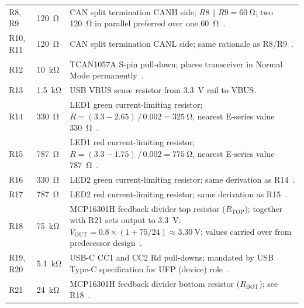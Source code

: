 \begin{longtable}{p{} p{} p{}}
  R8, R9
    & \SI{120}{\ohm}
    & CAN split termination CANH side; $R8 \parallel R9 = \SI{60}{\ohm}$;
      two \SI{120}{\ohm} in parallel preferred over one
      \SI{60}{\ohm}~\cite{ref16,ref17}. \\[4pt]

  R10, R11
    & \SI{120}{\ohm}
    & CAN split termination CANL side; same rationale as
      R8/R9~\cite{ref16,ref17}. \\[4pt]

  R12
    & \SI{10}{\kilo\ohm}
    & TCAN1057A S-pin pull-down; places transceiver in Normal Mode
      permanently~\cite{ref7}. \\[4pt]

  R13
    & \SI{1.5}{\kilo\ohm}
    & USB VBUS sense resistor from \SI{3.3}{\volt} rail to VBUS. \\[4pt]

  R14
    & \SI{330}{\ohm}
    & LED1 green current-limiting resistor;
      $R = (3.3 - 2.65)\,/\,0.002 = \SI{325}{\ohm}$,
      nearest E-series value \SI{330}{\ohm}~\cite{ref5}. \\[4pt]

  R15
    & \SI{787}{\ohm}
    & LED1 red current-limiting resistor;
      $R = (3.3 - 1.75)\,/\,0.002 = \SI{775}{\ohm}$,
      nearest E-series value \SI{787}{\ohm}~\cite{ref5}. \\[4pt]

  R16
    & \SI{330}{\ohm}
    & LED2 green current-limiting resistor; same derivation as
      R14~\cite{ref5}. \\[4pt]

  R17
    & \SI{787}{\ohm}
    & LED2 red current-limiting resistor; same derivation as
      R15~\cite{ref5}. \\[4pt]

  R18
    & \SI{75}{\kilo\ohm}
    & MCP16301H feedback divider top resistor ($R_\mathrm{TOP}$);
      together with R21 sets output to \SI{3.3}{\volt}:
      $V_\mathrm{OUT} = 0.8 \times (1 + 75/24) \approx \SI{3.30}{\volt}$;
      values carried over from predecessor design~\cite{ref2}. \\[4pt]

  R19, R20
    & \SI{5.1}{\kilo\ohm}
    & USB-C CC1 and CC2 Rd pull-downs; mandated by USB Type-C
      specification for UFP (device) role~\cite{ref22,ref23}. \\[4pt]

  R21
    & \SI{24}{\kilo\ohm}
    & MCP16301H feedback divider bottom resistor ($R_\mathrm{BOT}$);
      see R18~\cite{ref2}. \\

\end{longtable}
